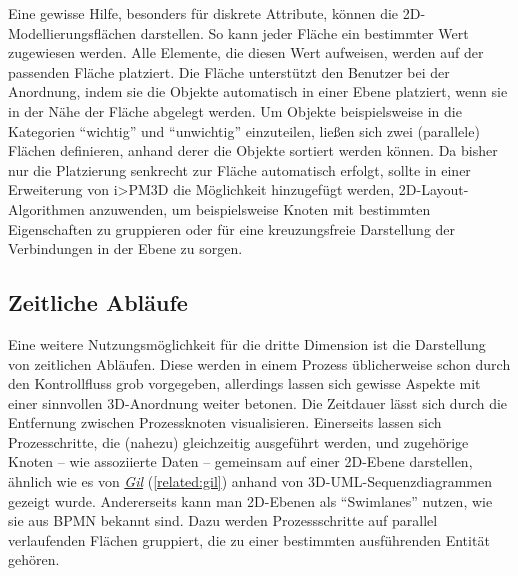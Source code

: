 \documentclass[a4paper,10pt]{sphinxmanual}
\begin{document}
Eine gewisse Hilfe, besonders für diskrete Attribute, können die 2D-Modellierungsflächen darstellen. So kann jeder Fläche ein bestimmter Wert zugewiesen werden.
Alle Elemente, die diesen Wert aufweisen, werden auf der passenden Fläche platziert.
Die Fläche unterstützt den Benutzer bei der Anordnung, indem sie die Objekte automatisch in einer Ebene platziert, wenn sie in der Nähe der Fläche abgelegt werden.
Um Objekte beispielsweise in die Kategorien "`wichtig"' und "`unwichtig"' einzuteilen, ließen sich zwei (parallele) Flächen definieren, anhand derer die Objekte sortiert werden können.
Da bisher nur die Platzierung senkrecht zur Fläche automatisch erfolgt, sollte in einer Erweiterung von i\textgreater{}PM3D die Möglichkeit hinzugefügt werden, 2D-Layout-Algorithmen anzuwenden, um beispielsweise Knoten mit bestimmten Eigenschaften zu gruppieren oder für eine kreuzungsfreie Darstellung der Verbindungen in der Ebene zu sorgen.


\subsection{Zeitliche Abläufe}
\label{visualisierung:zeitliche-ablaufe}
Eine weitere Nutzungsmöglichkeit für die dritte Dimension ist die Darstellung von zeitlichen Abläufen.
Diese werden in einem Prozess üblicherweise schon durch den Kontrollfluss grob vorgegeben, allerdings lassen sich gewisse Aspekte mit einer sinnvollen 3D-Anordnung weiter betonen.
Die Zeitdauer lässt sich durch die Entfernung zwischen Prozessknoten visualisieren.
Einerseits lassen sich Prozesschritte, die (nahezu) gleichzeitig ausgeführt werden, und zugehörige Knoten – wie assoziierte Daten – gemeinsam auf einer 2D-Ebene darstellen, ähnlich wie es von {\hyperref[related:gil]{\emph{Gil}}} (\autoref*{related:gil}) anhand von 3D-UML-Sequenzdiagrammen gezeigt wurde.
Andererseits kann man 2D-Ebenen als "`Swimlanes"' nutzen, wie sie aus BPMN bekannt sind.
Dazu werden Prozessschritte auf parallel verlaufenden Flächen gruppiert, die zu einer bestimmten ausführenden Entität gehören.
\end{document}

